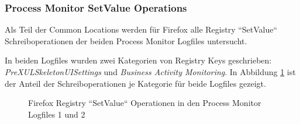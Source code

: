 \begin{appendices}
\subsubsection*{Process Monitor SetValue Operations}
\label{subsubsection:appendix-firefox-registry-processmonitorsetvalue}
Als Teil der Common Locations werden für Firefox alle Registry ``SetValue`` Schreiboperationen der beiden Process Monitor Logfiles untersucht.

In beiden Logfiles wurden zwei Kategorien von Registry Keys geschrieben: \textit{PreXULSkeletonUISettings} und \textit{Business Activity Monitoring}. In Abbildung \ref{chart:firefox-registy-css-vs-bam} ist der Anteil der Schreiboperationen je Kategorie für beide Logfiles gezeigt.
\begin{figure}[h!]
	\caption{Firefox Registry ``SetValue`` Operationen in den Process Monitor Logfiles 1 und 2}
	\label{chart:firefox-registy-css-vs-bam}
\end{figure}



\end{appendices}
